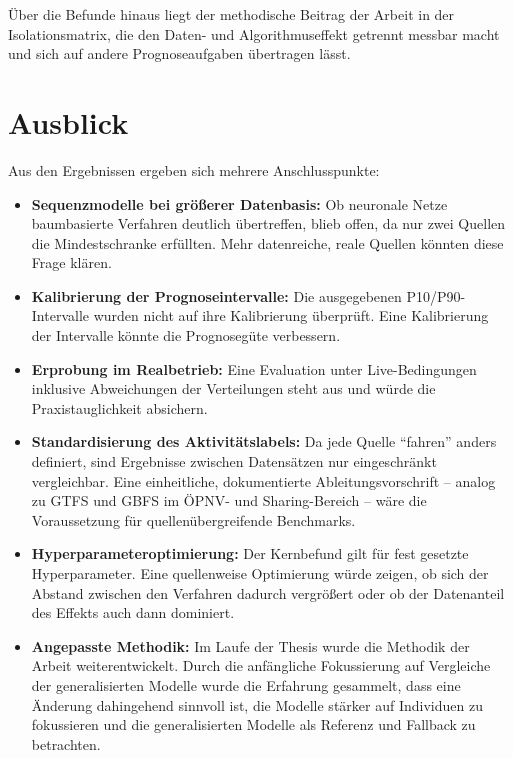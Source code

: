 Über die Befunde hinaus liegt der methodische Beitrag der Arbeit in der Isolationsmatrix, die den Daten- und Algorithmuseffekt getrennt messbar macht und sich auf andere Prognoseaufgaben übertragen lässt.

\section{Ausblick}
\label{sec:ausblick}

Aus den Ergebnissen ergeben sich mehrere Anschlusspunkte:
\begin{itemize}
    \item \textbf{Sequenzmodelle bei größerer Datenbasis:} Ob neuronale Netze baumbasierte Verfahren deutlich übertreffen, blieb offen, da nur zwei Quellen die Mindestschranke erfüllten. Mehr datenreiche, reale Quellen könnten diese Frage klären.
    \item \textbf{Kalibrierung der Prognoseintervalle:} Die ausgegebenen P10/P90-Intervalle wurden nicht auf ihre Kalibrierung überprüft. Eine Kalibrierung der Intervalle könnte die Prognosegüte verbessern.
    \item \textbf{Erprobung im Realbetrieb:} Eine Evaluation unter Live-Bedingungen inklusive Abweichungen der Verteilungen steht aus und würde die Praxistauglichkeit absichern.
    \item \textbf{Standardisierung des Aktivitätslabels:} Da jede Quelle \enquote{fahren} anders definiert, sind Ergebnisse zwischen Datensätzen nur eingeschränkt vergleichbar. Eine einheitliche, dokumentierte Ableitungsvorschrift -- analog zu GTFS und GBFS im ÖPNV- und Sharing-Bereich -- wäre die Voraussetzung für quellenübergreifende Benchmarks.
    \item \textbf{Hyperparameteroptimierung:} Der Kernbefund gilt für fest gesetzte Hyperparameter. Eine quellenweise Optimierung würde zeigen, ob sich der Abstand zwischen den Verfahren dadurch vergrößert oder ob der Datenanteil des Effekts auch dann dominiert.
    \item \textbf{Angepasste Methodik:} Im Laufe der Thesis wurde die Methodik der Arbeit weiterentwickelt. Durch die anfängliche Fokussierung auf Vergleiche der generalisierten Modelle wurde die Erfahrung gesammelt, dass eine Änderung dahingehend sinnvoll ist, die Modelle stärker auf Individuen zu fokussieren und die generalisierten Modelle als Referenz und Fallback zu betrachten. 
\end{itemize}
